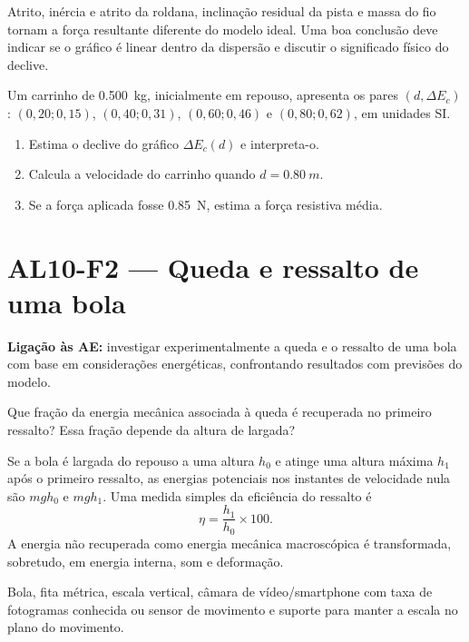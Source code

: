 \documentclass[11pt,a4paper,openany]{book}
\newcounter{exercicio}[chapter]
\renewcommand{\theexercicio}{\thechapter.\arabic{exercicio}}
\newenvironment{exercicio}[1][]%
{\refstepcounter{exercicio}%
\begin{tcolorbox}[breakable,colback=white,colframe=eublue!70,
 title={Exercício \theexercicio\if\relax\detokenize{#1}\relax\else\ --- #1\fi},fonttitle=\bfseries]}%
{\end{tcolorbox}}
\newcommand{\LigAE}[1]{\textbf{Ligação às AE:} #1}
\begin{document}
\begin{erros}
Atrito, inércia e atrito da roldana, inclinação residual da pista e massa do fio tornam a força resultante diferente do modelo ideal. Uma boa conclusão deve indicar se o gráfico é linear dentro da dispersão e discutir o significado físico do declive.
\end{erros}

\begin{exercicio}[Do gráfico à força]
Um carrinho de \SI{0.500}{kg}, inicialmente em repouso, apresenta os pares $(d,\Delta E_c)$: $(0,20;0,15)$, $(0,40;0,31)$, $(0,60;0,46)$ e $(0,80;0,62)$, em unidades SI.
\begin{enumerate}[label=\alph*)]
\item Estima o declive do gráfico $\Delta E_c(d)$ e interpreta-o.
\item Calcula a velocidade do carrinho quando $d=\SI{0.80}{m}$.
\item Se a força aplicada fosse \SI{0.85}{N}, estima a força resistiva média.
\end{enumerate}
\end{exercicio}

\section{AL10-F2 — Queda e ressalto de uma bola}
\LigAE{investigar experimentalmente a queda e o ressalto de uma bola com base em considerações energéticas, confrontando resultados com previsões do modelo.}

\begin{questao}
Que fração da energia mecânica associada à queda é recuperada no primeiro ressalto? Essa fração depende da altura de largada?
\end{questao}

\begin{fundamento}
Se a bola é largada do repouso a uma altura $h_0$ e atinge uma altura máxima $h_1$ após o primeiro ressalto, as energias potenciais nos instantes de velocidade nula são $mgh_0$ e $mgh_1$. Uma medida simples da eficiência do ressalto é
\[
\eta=\frac{h_1}{h_0}\times100.
\]
A energia não recuperada como energia mecânica macroscópica é transformada, sobretudo, em energia interna, som e deformação.
\end{fundamento}

\begin{material}
Bola, fita métrica, escala vertical, câmara de vídeo/smartphone com taxa de fotogramas conhecida ou sensor de movimento e suporte para manter a escala no plano do movimento.
\end{material}
\end{document}
